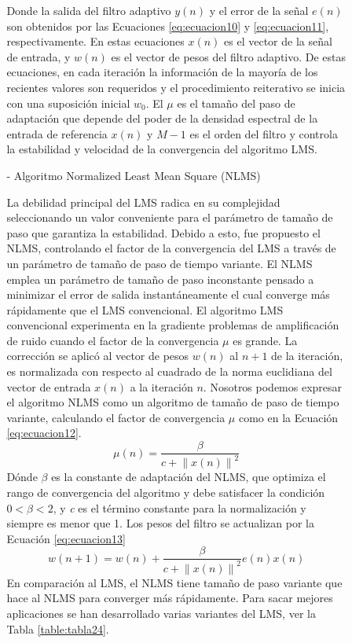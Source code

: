 \begin{enumerate}
\begin{enumerate}
\begin{enumerate}
Donde la salida del filtro adaptivo $y(n)$ y el error de la señal $e(n)$ son obtenidos por las Ecuaciones \eqref{eq:ecuacion10} y \eqref{eq:ecuacion11}, respectivamente. En estas ecuaciones $x(n)$ es el vector de la señal de entrada, y $w(n)$ es el vector de pesos del filtro adaptivo. 
\vskip 0.5cm
De estas ecuaciones, en cada iteración la información de la mayoría de los recientes valores son requeridos y el procedimiento reiterativo se inicia con una suposición inicial $w_{0}$. El $\mu$ es el tamaño del paso de adaptación que depende del poder de la densidad espectral de la entrada de referencia $x(n)$ y $M-1$ es el orden del filtro y controla la estabilidad y velocidad de la convergencia del algoritmo LMS.
\vskip 0.5cm
\item[-]Algoritmo Normalized Least Mean Square (NLMS)
\par
La debilidad principal del LMS radica en su complejidad seleccionando un valor conveniente para el parámetro de tamaño de paso que garantiza la estabilidad. Debido a esto, fue propuesto el NLMS, controlando el factor de la convergencia del LMS a través de un parámetro de tamaño de paso de tiempo variante. 
\vskip 0.5cm
El NLMS emplea un parámetro de tamaño de paso inconstante pensado a minimizar el error de salida instantáneamente el cual converge más rápidamente que el LMS convencional. El algoritmo LMS convencional experimenta en la gradiente problemas de amplificación de ruido cuando el factor de la convergencia $\mu$ es grande. La corrección se aplicó al vector de pesos $w(n)$ al $n+1$ de la iteración, es normalizada con respecto al cuadrado de la norma euclidiana del vector de entrada $x(n)$ a la iteración $n$. 
\vskip 0.5cm
Nosotros podemos expresar el algoritmo NLMS como un algoritmo de tamaño de paso de tiempo variante, calculando el factor de convergencia $\mu$ como en la Ecuación \eqref{eq:ecuacion12}.
\vskip -0.5cm
\begin{equation}
\label{eq:ecuacion12}
\mu(n) = \frac{\beta }{c+\left \| x(n) \right \|^{2}}
\end{equation}
\vskip 0.5cm
Dónde $\beta$ es la constante de adaptación del NLMS, que optimiza el rango de convergencia del algoritmo y debe satisfacer la condición $0< \beta <2$, y \textit{c} es el término constante para la normalización y siempre es menor que 1. Los pesos del filtro se actualizan por la Ecuación \eqref{eq:ecuacion13}
\vskip -0.5cm
\begin{equation}
\label{eq:ecuacion13}
w(n+1) = w(n) + \frac{\beta }{c+\left \| x(n) \right \|^{2}}e(n)x(n)
\end{equation}
\vskip 0.5cm
En comparación al LMS, el NLMS tiene tamaño de paso variante que hace al NLMS para converger más rápidamente. Para sacar mejores aplicaciones se han desarrollado varias variantes del LMS, ver la Tabla \ref{table:tabla24}.
\end{enumerate}


\end{enumerate}
\end{enumerate}
